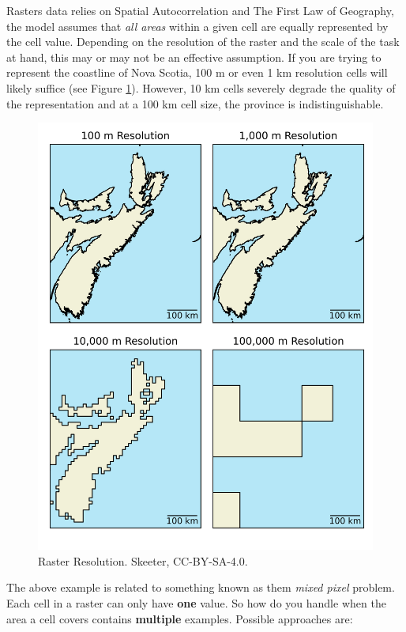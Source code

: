 \documentclass[
]{book}
\begin{document}
Rasters data relies on Spatial Autocorrelation and The First Law of Geography, the model assumes that \emph{all areas} within a given cell are equally represented by the cell value. Depending on the resolution of the raster and the scale of the task at hand, this may or may not be an effective assumption. If you are trying to represent the coastline of Nova Scotia, 100 m or even 1 km resolution cells will likely suffice (see Figure \ref{fig:3-raster-resolution}). However, 10 km cells severely degrade the quality of the representation and at a 100 km cell size, the province is indistinguishable.

\begin{figure}
\includegraphics[width=0.75\linewidth]{images/03-raster-resolution} \caption{Raster Resolution. Skeeter, CC-BY-SA-4.0.}\label{fig:3-raster-resolution}
\end{figure}

The above example is related to something known as them \emph{mixed pixel} problem. Each cell in a raster can only have \textbf{one} value. So how do you handle when the area a cell covers contains \textbf{multiple} examples. Possible approaches are:
\end{document}
